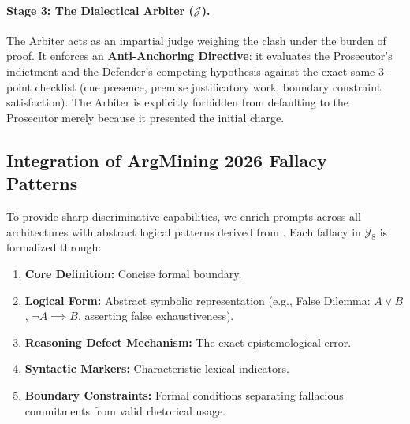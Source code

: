 \documentclass[11pt]{article}
\begin{document}
\paragraph{Stage 3: The Dialectical Arbiter ($\mathcal{J}$).}
The Arbiter acts as an impartial judge weighing the clash under the burden of proof. It enforces an \textbf{Anti-Anchoring Directive}: it evaluates the Prosecutor's indictment and the Defender's competing hypothesis against the exact same 3-point checklist (cue presence, premise justificatory work, boundary constraint satisfaction). The Arbiter is explicitly forbidden from defaulting to the Prosecutor merely because it presented the initial charge.

\subsection{Integration of ArgMining 2026 Fallacy Patterns}
To provide sharp discriminative capabilities, we enrich prompts across all architectures with abstract logical patterns derived from \citet{papadopulos2026}. Each fallacy in $\mathcal{Y}_{\text{8}}$ is formalized through:
\begin{enumerate}[leftmargin=*,itemsep=1pt,topsep=2pt]
    \item \textbf{Core Definition:} Concise formal boundary.
    \item \textbf{Logical Form:} Abstract symbolic representation (e.g., False Dilemma: $A \lor B$, $\neg A \implies B$, asserting false exhaustiveness).
    \item \textbf{Reasoning Defect Mechanism:} The exact epistemological error.
    \item \textbf{Syntactic Markers:} Characteristic lexical indicators.
    \item \textbf{Boundary Constraints:} Formal conditions separating fallacious commitments from valid rhetorical usage.
\end{enumerate}
\end{document}
